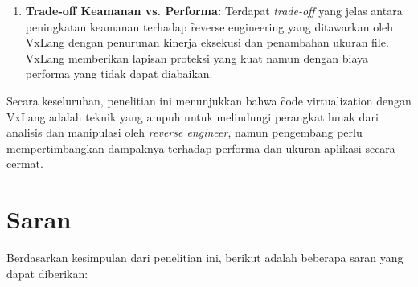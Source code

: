 \begin{enumerate}
    \item \textbf{Trade-off Keamanan vs. Performa:} Terdapat \textit{trade-off} yang jelas antara peningkatan keamanan terhadap \f{reverse engineering} yang ditawarkan oleh VxLang dengan penurunan kinerja eksekusi dan penambahan ukuran file. VxLang memberikan lapisan proteksi yang kuat namun dengan biaya performa yang tidak dapat diabaikan.
\end{enumerate}

Secara keseluruhan, penelitian ini menunjukkan bahwa \f{code virtualization} dengan VxLang adalah teknik yang ampuh untuk melindungi perangkat lunak dari analisis dan manipulasi oleh \textit{reverse engineer}, namun pengembang perlu mempertimbangkan dampaknya terhadap performa dan ukuran aplikasi secara cermat.

\section{Saran}
Berdasarkan kesimpulan dari penelitian ini, berikut adalah beberapa saran yang dapat diberikan:

